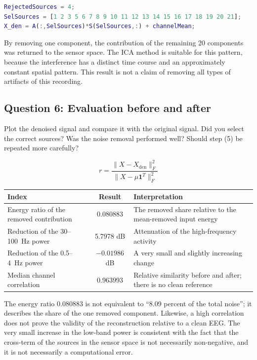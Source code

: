 \begin{lstlisting}[language=Matlab]
RejectedSources = 4;
SelSources = [1 2 3 5 6 7 8 9 10 11 12 13 14 15 16 17 18 19 20 21];
X_den = A(:,SelSources)*S(SelSources,:) + channelMean;
\end{lstlisting}

By removing one component, the contribution of the remaining 20 components was returned to the sensor space. The ICA method is suitable for this pattern, because the interference has a distinct time course and an approximately constant spatial pattern. This result is not a claim of removing all types of artifacts of this recording.

\subsection*{Question 6: Evaluation before and after}
\begin{taskbox}
Plot the denoised signal and compare it with the original signal. Did you select the correct sources? Was the noise removal performed well? Should step (5) be repeated more carefully?
\end{taskbox}

\begin{equation}
r=\frac{\|X-X_{\mathrm{den}}\|_F^{2}}{\|X-\mu\mathbf{1}^{T}\|_F^{2}}
\end{equation}

\begin{center}
\small
\begin{tabularx}{\textwidth}{@{}>{\raggedright\arraybackslash}Xc>{\raggedright\arraybackslash}X@{}}
\toprule
\textbf{Index} & \textbf{Result} & \textbf{Interpretation}\\
\midrule
Energy ratio of the removed contribution & 0.080883 & The removed share relative to the mean-removed input energy\\
Reduction of the 30--100~Hz power & 5.7978 dB & Attenuation of the high-frequency activity\\
Reduction of the 0.5--4~Hz power & $-0.01986$ dB & A very small and slightly increasing change\\
Median channel correlation & 0.963993 & Relative similarity before and after; there is no clean reference\\
\bottomrule
\end{tabularx}
\end{center}

The energy ratio 0.080883 is not equivalent to ``8.09 percent of the total noise''; it describes the share of the one removed component. Likewise, a high correlation does not prove the validity of the reconstruction relative to a clean EEG. The very small increase in the low-band power is consistent with the fact that the cross-term of the sources in the sensor space is not necessarily non-negative, and it is not necessarily a computational error.


